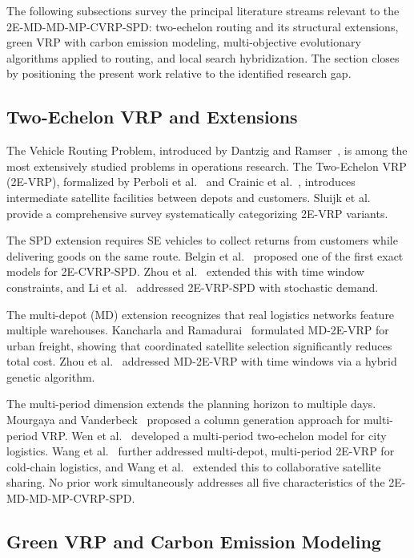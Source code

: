 \documentclass[11pt, a4paper]{article}
\numberwithin{equation}{section}
\begin{document}
The following subsections survey the principal literature streams relevant to
the 2E-MD-MD-MP-CVRP-SPD: two-echelon routing and its structural extensions,
green VRP with carbon emission modeling, multi-objective evolutionary
algorithms applied to routing, and local search hybridization.  The section
closes by positioning the present work relative to the identified research gap.

\subsection{Two-Echelon VRP and Extensions}

The Vehicle Routing Problem, introduced by Dantzig and
Ramser~\cite{dantzig1959}, is among the most extensively studied problems in
operations research.  The Two-Echelon VRP (2E-VRP), formalized by
Perboli et al.~\cite{perboli2011} and Crainic et al.~\cite{crainic2011},
introduces intermediate satellite facilities between depots and customers.
Sluijk et al.~\cite{sluijk2023} provide a comprehensive survey systematically
categorizing 2E-VRP variants.

The SPD extension requires SE vehicles to collect returns from customers while
delivering goods on the same route.  Belgin et al.~\cite{belgin2018} proposed
one of the first exact models for 2E-CVRP-SPD\@.  Zhou
et al.~\cite{zhou2022spd} extended this with time window constraints, and
Li et al.~\cite{li2022stoch} addressed 2E-VRP-SPD with stochastic demand.

The multi-depot (MD) extension recognizes that real logistics networks feature
multiple warehouses.  Kancharla and Ramadurai~\cite{kancharla2019} formulated
MD-2E-VRP for urban freight, showing that coordinated satellite selection
significantly reduces total cost.  Zhou et al.~\cite{zhou2018md} addressed
MD-2E-VRP with time windows via a hybrid genetic algorithm.

The multi-period dimension extends the planning horizon to multiple days.
Mourgaya and Vanderbeck~\cite{mourgaya2007} proposed a column generation
approach for multi-period VRP\@.  Wen et al.~\cite{wen2010} developed a
multi-period two-echelon model for city logistics.  Wang
et al.~\cite{wang2021} further addressed multi-depot, multi-period 2E-VRP
for cold-chain logistics, and Wang et al.~\cite{wang2023} extended this to
collaborative satellite sharing.  No prior work simultaneously addresses all
five characteristics of the 2E-MD-MD-MP-CVRP-SPD.

\subsection{Green VRP and Carbon Emission Modeling}
\end{document}
